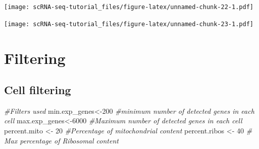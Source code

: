 \documentclass[
]{book}
\newenvironment{Shaded}{\begin{snugshade}}{\end{snugshade}}
\newcommand{\AttributeTok}[1]{\textcolor[rgb]{0.77,0.63,0.00}{#1}}
\newcommand{\CommentTok}[1]{\textcolor[rgb]{0.56,0.35,0.01}{\textit{#1}}}
\newcommand{\ControlFlowTok}[1]{\textcolor[rgb]{0.13,0.29,0.53}{\textbf{#1}}}
\newcommand{\DecValTok}[1]{\textcolor[rgb]{0.00,0.00,0.81}{#1}}
\newcommand{\FloatTok}[1]{\textcolor[rgb]{0.00,0.00,0.81}{#1}}
\newcommand{\FunctionTok}[1]{\textcolor[rgb]{0.00,0.00,0.00}{#1}}
\newcommand{\NormalTok}[1]{#1}
\newcommand{\OtherTok}[1]{\textcolor[rgb]{0.56,0.35,0.01}{#1}}
\newcommand{\SpecialCharTok}[1]{\textcolor[rgb]{0.00,0.00,0.00}{#1}}
\newcommand{\StringTok}[1]{\textcolor[rgb]{0.31,0.60,0.02}{#1}}
\begin{document}
\texttt{[image: scRNA-seq-tutorial\_files/figure-latex/unnamed-chunk-22-1.pdf]}

\begin{Shaded}
\end{Shaded}

\texttt{[image: scRNA-seq-tutorial\_files/figure-latex/unnamed-chunk-23-1.pdf]}

\hypertarget{filtering}{%
\section{Filtering}\label{filtering}}

\hypertarget{cell-filtering}{%
\subsection{Cell filtering}\label{cell-filtering}}

\begin{Shaded}
\begin{Highlighting}[]
\CommentTok{\#Filters used }
\NormalTok{min.exp\_genes}\OtherTok{\textless{}{-}}\DecValTok{200} \CommentTok{\#minimum number of detected genes in each cell}
\NormalTok{max.exp\_genes}\OtherTok{\textless{}{-}}\DecValTok{6000} \CommentTok{\#Maximum number of detected genes in each cell}
\NormalTok{percent.mito }\OtherTok{\textless{}{-}} \DecValTok{20} \CommentTok{\#Percentage of mitochondrial content}
\NormalTok{percent.ribos }\OtherTok{\textless{}{-}} \DecValTok{40} \CommentTok{\# Max percentage of Ribosomal content}
\end{Highlighting}
\end{Shaded}
\end{document}

